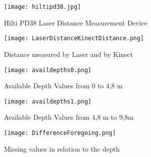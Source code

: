 \begin{figure}[htp]
\begin{center}
  \texttt{[image: hiltipd38.jpg]}
  \caption{Hilti PD38 Laser Distance Measurement Device}
  \label{figure:hilti}
\end{center}
\end{figure}
\begin{figure}[htp]

\begin{center}
  \texttt{[image: LaserDistanceKinectDistance.png]}
  \caption{Distance measured by Laser and by Kinect}
  \label{figure:LaserKinect}
\end{center}
\end{figure}

\begin{figure}[htp]
\begin{center}
  \texttt{[image: availdepths0.png]}
  \caption{Available Depth Values from 0 to 4,8 m}
  \label{figure:depths1}
\end{center}
\end{figure}

\begin{figure}[htp]
\begin{center}
  \texttt{[image: availdepths1.png]}
  \caption{Available Depth Values from 4,8 m to 9,8m}
  \label{figure:depths2}
\end{center}
\end{figure}

\begin{figure}[htp]
\begin{center}
  \texttt{[image: DifferenceForegoing.png]}
  \caption{Missing values in relation to the depth}
  \label{figure:DepthValueDiff}
\end{center}
\end{figure}
